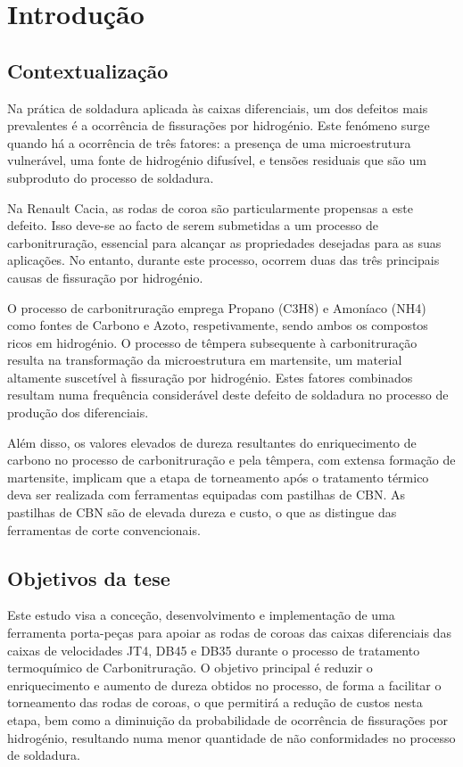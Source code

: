 \chapter{Introdução} \label{ch:intro}
\setlength{\headheight}{13.6pt}

\section{Contextualização} \label{s:intro_contextualizacao}

Na prática de soldadura aplicada às caixas diferenciais, um dos defeitos mais prevalentes é a ocorrência de fissurações por hidrogénio. Este fenómeno surge quando há a ocorrência  de três fatores: a presença de uma microestrutura vulnerável, uma fonte de hidrogénio difusível, e tensões residuais que são um subproduto do processo de soldadura.

Na Renault Cacia, as rodas de coroa são particularmente propensas a este defeito. Isso deve-se ao facto de serem submetidas a um processo de carbonitruração, essencial para alcançar as propriedades desejadas para as suas aplicações. No entanto, durante este processo, ocorrem duas das três principais causas de fissuração por hidrogénio.

O processo de carbonitruração emprega Propano (C3H8) e Amoníaco (NH4) como fontes de Carbono e Azoto, respetivamente, sendo ambos os compostos ricos em hidrogénio. O processo de têmpera subsequente à carbonitruração resulta na transformação da microestrutura em martensite, um material altamente suscetível à fissuração por hidrogénio. Estes fatores combinados resultam numa frequência considerável deste defeito de soldadura no processo de produção dos diferenciais.

Além disso, os valores elevados de dureza resultantes do enriquecimento de carbono no processo de carbonitruração e pela têmpera, com extensa formação de martensite, implicam que a etapa de torneamento após o tratamento térmico deva ser realizada com ferramentas equipadas com pastilhas de CBN. As pastilhas de CBN são de elevada dureza e custo, o que as distingue das ferramentas de corte convencionais.
\section{Objetivos da tese} \label{s:intro_objetivos}
Este estudo visa a conceção, desenvolvimento e implementação de uma ferramenta porta-peças para apoiar as rodas de coroas das caixas diferenciais das caixas de velocidades JT4, DB45 e DB35 durante o processo de tratamento termoquímico de Carbonitruração. O objetivo principal é reduzir o enriquecimento e aumento de dureza obtidos no processo, de forma a facilitar o torneamento das rodas de coroas, o que permitirá a redução de custos nesta etapa, bem como a diminuição da probabilidade de ocorrência de fissurações por hidrogénio, resultando numa menor quantidade de não conformidades no processo de soldadura.

